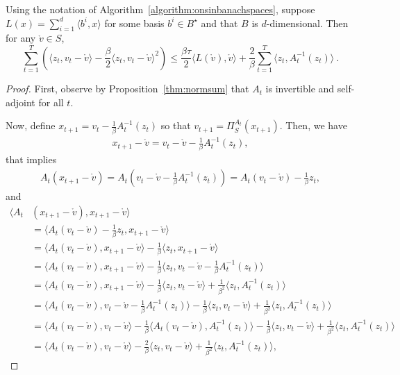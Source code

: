 \documentclass[12pt]{colt2018} %
\renewcommand{\v}{\mathring{v}}
\begin{document}
\begin{theorem}\label{thm:onsfirstpass}
Using the notation of Algorithm~\ref{algorithm:onsinbanachspaces},
suppose $L(x)=\sum_{i=1}^d\langle b^i,x\rangle$ for some basis $b^i\in B^\star$ and that $B$ is $d$-dimensional. Then for any $\v\in S$,
\[
\sum_{t=1}^T \left(\langle z_t, v_t - \v \rangle -\frac{\beta}{2} \langle z_t, v_t -\v\rangle^2\right)
\leq \frac{\beta\tau}{2} \langle L(\v), \v\rangle + \frac{2}{\beta} \sum_{t=1}^T \langle z_t,  A^{-1}_{t}(z_t)\rangle~.
\]
\end{theorem}
%
\begin{proof}
First, observe by Proposition~\ref{thm:normsum} that $A_t$ is invertible and self-adjoint for all $t$.

Now, define $x_{t+1}=v_t - \frac{1}{\beta} A^{-1}_{t}(z_t)$ so that $v_{t+1}=\Pi^{A_t}_S(x_{t+1})$.
Then, we have
\begin{align*}
x_{t+1} - \v = v_t - \v - \frac{1}{\beta} A^{-1}_{t}(z_t),
\end{align*}
that implies
\begin{align*}
A_{t}(x_{t+1} - \v) = A_{t}(v_t - \v - \frac{1}{\beta} A^{-1}_{t}(z_t)) = A_{t}(v_t - \v) - \frac{1}{\beta} z_t,
\end{align*}
and
\begin{align*}
\langle A_{t}&(x_{t+1} - \v),x_{t+1} - \v\rangle \\
&= \langle A_{t}(v_t - \v) - \frac{1}{\beta} z_t, x_{t+1} - \v\rangle \\
&= \langle A_{t}(v_t - \v), x_{t+1} - \v\rangle - \frac{1}{\beta} \langle z_t, x_{t+1} - \v\rangle \\
&= \langle A_{t}(v_t - \v), x_{t+1} - \v\rangle - \frac{1}{\beta} \langle z_t, v_t - \v - \frac{1}{\beta} A^{-1}_{t}(z_t)\rangle \\
&= \langle A_{t}(v_t - \v), x_{t+1} - \v\rangle - \frac{1}{\beta} \langle z_t, v_t - \v\rangle  + \frac{1}{\beta^2} \langle z_t,  A^{-1}_{t}(z_t)\rangle \\
&= \langle A_{t}(v_t - \v), v_t - \v - \frac{1}{\beta} A^{-1}_{t}(z_t)\rangle - \frac{1}{\beta} \langle z_t, v_t - \v\rangle  + \frac{1}{\beta^2} \langle z_t,  A^{-1}_{t}(z_t)\rangle \\
&= \langle A_{t}(v_t - \v), v_t - \v\rangle - \frac{1}{\beta} \langle A_{t}(v_t - \v), A^{-1}_{t}(z_t)\rangle - \frac{1}{\beta} \langle z_t, v_t - \v\rangle  + \frac{1}{\beta^2} \langle z_t,  A^{-1}_{t}(z_t)\rangle \\
&= \langle A_{t}(v_t - \v), v_t - \v\rangle - \frac{2}{\beta} \langle z_t, v_t - \v\rangle  + \frac{1}{\beta^2} \langle z_t,  A^{-1}_{t}(z_t)\rangle,

\end{align*}
\end{proof}
\end{document}
